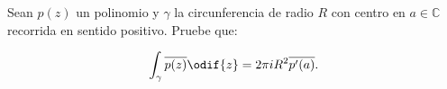\documentclass[../main.tex]{subfiles}
\begin{document}
\begin{problema}
    Sean \(p(z)\) un polinomio y \(\gamma\) la circunferencia de radio \(R\) con
    centro en \(a\in \mathbb{C}\) recorrida en sentido positivo. Pruebe que:

    \begin{equation*}
        \int_{\gamma}^{}\overline{p(z)}\odif{z} = 2\pi i R^{2}\overline{p^{\prime}(a)}.
    \end{equation*}
\end{problema}
\end{document}

